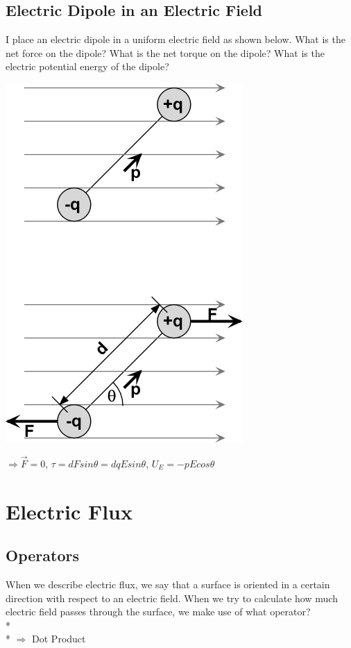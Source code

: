 \documentclass[11pt]{article}
\begin{document}
\subsection{Electric Dipole in an Electric Field}
I place an electric dipole in a uniform electric field as shown below.  What is the net force on the dipole?  What is the net torque on the dipole?  What is the electric potential energy of the dipole?

\begin{center}
\includegraphics[scale=0.25]{Images/electric_dipole.png}
\end{center}

$\Rightarrow \vec{F} = 0$, \hspace{2mm}$\tau = dFsin\theta = dqEsin\theta$, \hspace{2mm}$U_E = -pEcos\theta$


\pagebreak
\section{Electric Flux}

\subsection{Operators}
When we describe electric flux, we say that a surface is oriented in a certain direction with respect to an electric field. When we try to calculate how much electric field passes through the surface, we make use of what operator?\\* \\*
$\Rightarrow$ Dot Product
\end{document}

